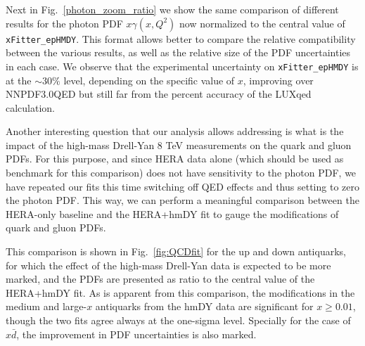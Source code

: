 Next in Fig.~\ref{photon_zoom_ratio} we show the same comparison of different
results for the photon PDF $x\gamma(x,Q^2)$ now normalized to the central value of {\tt xFitter\_epHMDY}.
%
This format allows better to compare the relative compatibility between the various results,
as well as the relative size of the PDF uncertainties in each case.
%
We observe that the experimental uncertainty on {\tt xFitter\_epHMDY} is at the $\sim 30\%$ level,
depending on the specific value of $x$, improving over NNPDF3.0QED but still far from the
percent accuracy of the LUXqed calculation.


Another interesting question that our analysis allows addressing is what is
the impact of the high-mass Drell-Yan 8 TeV measurements on the quark and gluon
PDFs.
%
For this purpose, and since HERA data alone (which should be used as benchmark for
this comparison) does not have sensitivity to the photon PDF,
we have repeated our fits this time switching off QED effects and thus setting to zero
the photon PDF.
%
This way, we can perform a meaningful comparison between the HERA-only baseline and the
HERA+hmDY fit to gauge the modifications of quark and gluon PDFs.

This comparison is shown in Fig.~\ref{fig:QCDfit} for the up and down antiquarks,
for which the effect of the high-mass
Drell-Yan data is expected to be more marked, and the PDFs are presented
as ratio to the central value of the HERA+hmDY fit.
%
As is apparent from this comparison, the modifications in the medium and large-$x$
antiquarks from the hmDY data are significant for $x\ge 0.01$, though the two fits
agree always at the one-sigma level.
%
Specially for the case of $x\bar{d}$, the improvement in PDF uncertainties
is also marked.

